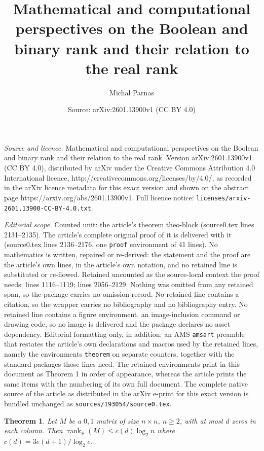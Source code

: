 \documentclass[10pt,a4paper]{amsart}
\title{Mathematical and computational perspectives on the Boolean and binary rank and their relation to the real rank}
\author{Michal Parnas}
\date{Source: arXiv:2601.13900v1 (CC BY 4.0)}
\newtheorem{theorem}{Theorem}
\newcommand{\Rbool}{{\rank}_\mathbb{B}}
\newcommand{\rank}{\mathop{\mathrm{rank}}}
\begin{document}
\maketitle

\noindent\emph{Source and licence.} Mathematical and computational perspectives on the Boolean and binary rank and their relation to the real rank. Version arXiv:2601.13900v1 (CC BY 4.0), distributed by arXiv under the Creative Commons Attribution 4.0 International licence, http://creativecommons.org/licenses/by/4.0/, as recorded in the arXiv licence metadata for this exact version and shown on the abstract page https://arxiv.org/abs/2601.13900v1. Full licence notice: \texttt{licenses/arxiv-2601.13900-CC-BY-4.0.txt}.\par\smallskip

\noindent\textit{Editorial scope.} Counted unit: the article's theorem theo-block (source0.tex lines 2131--2135). The article's complete original proof of it is delivered with it (source0.tex lines 2136--2176, one \texttt{proof} environment of 41 lines). No mathematics is written, repaired or re-derived: the statement and the proof are the article's own lines, in the article's own notation, and no retained line is substituted or re-flowed.  Retained uncounted as the source-local context the proof needs: lines 1116--1119; lines 2056--2129.  Nothing was omitted from any retained span, so the package carries no omission record.  No retained line contains a citation, so the wrapper carries no bibliography and no bibliography entry.  No retained line contains a figure environment, an image-inclusion command or drawing code, so no image is delivered and the package declares no asset dependency.  Editorial formatting only, in addition: an AMS \texttt{amsart} preamble that restates the article's own declarations and macros used by the retained lines, namely the environments \texttt{theorem} on separate counters, together with the standard packages those lines need.  The retained environments print in this document as Theorem 1 in order of appearance, whereas the article prints the same items with the numbering of its own full document.  The complete native source of the article as distributed in the arXiv e-print for this exact version is bundled unchanged as \texttt{sources/193054/source0.tex}.
\begin{theorem}
\label{theo:Alon}
Let $M$ be a $0,1$ matrix of size $n \times n$, $n \geq 2$, with at most $d$ zeros in each column. Then $\Rbool(M) \leq c(d) \log_2 n$ where $c(d) =  3e(d+1)/\log_2 e $.
\end{theorem}
\end{document}
